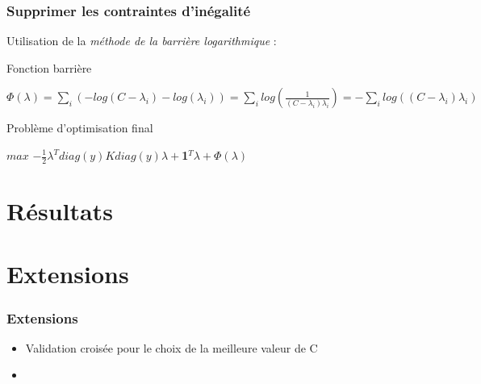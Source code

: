 \documentclass{beamer}
\begin{document}
\begin{frame}
\frametitle{Supprimer les contraintes d'inégalité}

Utilisation de la \emph{méthode de la barrière logarithmique} :

\begin{block}{Fonction barrière}
          \begin{center}
          $\Phi(\lambda) = \sum_i (- log(C - \lambda_i) - log(\lambda_i)) = \sum_i log(\frac{1}{(C - \lambda_i)\lambda_i}) = - \sum_i log((C - \lambda_i)\lambda_i)$ 
          \end{center}
\end{block}

\begin{block}{Problème d'optimisation final}
          \begin{center}
          $max$ $-\frac{1}{2}\lambda^Tdiag(y)Kdiag(y)\lambda+$\textbf{1}$^T\lambda + \Phi(\lambda)$\\ 
          \end{center}
\end{block}

\end{frame}

\section{Résultats}


\section{Extensions}

\begin{frame}
\frametitle{Extensions}

\begin{itemize}
\item Validation croisée pour le choix de la meilleure valeur de C

\item %
\end{itemize}

\end{frame}

\end{document}
